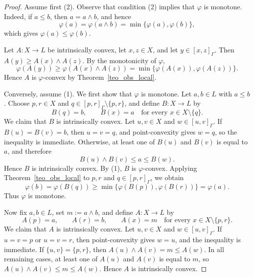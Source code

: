 \documentclass[11pt,a4paper]{article}
\begin{document}
\begin{proof}
Assume first (2). Observe that condition (2) implies that \(\varphi\) is monotone. Indeed, if \(a\leq b\), then \(a=a\wedge b\), and hence
\begin{equation*}
\varphi(a)
=
\varphi(a\wedge b)
=
\min\{\varphi(a),\varphi(b)\},
\end{equation*}
which gives \(\varphi(a)\leq\varphi(b)\).

Let \(A:X\to L\) be intrinsically convex, let \(x,z\in X\), and let \(y\in[x,z]_{\Gamma}\). Then \(A(y)\ge A(x)\wedge A(z)\). By the monotonicity of \(\varphi\),
\begin{equation*}
\varphi(A(y))
\ge
\varphi(A(x)\wedge A(z))
=
\min\{\varphi(A(x)),\varphi(A(z))\}.
\end{equation*}
Hence \(A\) is \(\varphi\)-convex by Theorem~\ref{teo_obs_local}.

Conversely, assume (1). We first show that \(\varphi\) is monotone. Let \(a,b\in L\) with \(a\leq b\). Choose \(p,r\in X\) and \(q\in[p,r]_{\Gamma}\setminus\{p,r\}\), and define \(B:X\to L\) by
\begin{equation*}
B(q)=b,\qquad B(x)=a\quad\text{for every }x\in X\setminus\{q\}.
\end{equation*}
We claim that \(B\) is intrinsically convex. Let \(u,v\in X\) and \(w\in[u,v]_{\Gamma}\). If \(B(u)=B(v)=b\), then \(u=v=q\), and point-convexity gives \(w=q\), so the inequality is immediate. Otherwise, at least one of \(B(u)\) and \(B(v)\) is equal to \(a\), and therefore
\begin{equation*}
B(u)\wedge B(v)\leq a\leq B(w).
\end{equation*}
Hence \(B\) is intrinsically convex. By (1), \(B\) is \(\varphi\)-convex. Applying Theorem~\ref{teo_obs_local} to \(p,r\) and \(q\in[p,r]_{\Gamma}\), we obtain
\begin{equation*}
\varphi(b)
=
\varphi(B(q))
\geq
\min\{\varphi(B(p)),\varphi(B(r))\}
=
\varphi(a).
\end{equation*}
Thus \(\varphi\) is monotone.

Now fix \(a,b\in L\), set \(m:=a\wedge b\), and define \(A:X\to L\) by
\begin{equation*}
A(p)=a,\qquad A(r)=b,\qquad A(x)=m\quad\text{for every }x\in X\setminus\{p,r\}.
\end{equation*}
We claim that \(A\) is intrinsically convex. Let \(u,v\in X\) and \(w\in[u,v]_{\Gamma}\). If \(u=v=p\) or \(u=v=r\), then point-convexity gives \(w=u\), and the inequality is immediate. If \(\{u,v\}=\{p,r\}\), then \(A(u)\wedge A(v)=m\le A(w)\). In all remaining cases, at least one of \(A(u)\) and \(A(v)\) is equal to \(m\), so \(A(u)\wedge A(v)\le m\le A(w)\). Hence \(A\) is intrinsically convex.


\end{proof}
\end{document}
